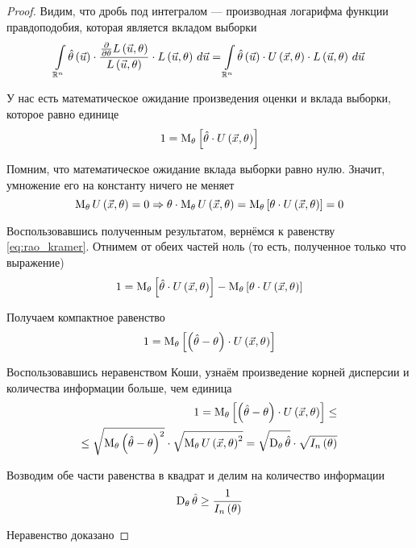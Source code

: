 \begin{proof}
  Видим, что дробь под интегралом --- производная логарифма
  функции правдоподобия, которая является вкладом выборки
  $$\integral{\mathbb{R}^n}{}{\vec{u}}{\hat{\theta}\left( \vec{u} \right)
    \cdot \frac{
      \frac{\partial}{\partial \theta}L\left( \vec{u},\theta \right)}
      {L\left( \vec{u},\theta \right)}
        \cdot L\left( \vec{u},\theta \right)}
    = \integral{\mathbb{R}^n}{}{\vec{u}}{\hat{\theta}\left( \vec{u} \right)
      \cdot
        U\left( \vec{x},\theta \right)
          \cdot L\left( \vec{u},\theta \right)}$$

  У нас есть математическое ожидание произведения оценки и вклада выборки,
  которое равно единице
  \begin{equation}\label{eq:rao_kramer}
    1 = \Meanof{\theta}{\hat{\theta}\cdot U\left( \vec{x},\theta \right)}
  \end{equation}

  Помним, что математическое ожидание вклада выборки равно нулю.
  Значит, умножение его на константу ничего не меняет
  $$\meanof{\theta}{U\left( \vec{x},\theta \right)}=0
    \Rightarrow 
    \theta\cdot\meanof{\theta}{U\left( \vec{x},\theta \right)}
    = \Meanof{\theta}{\theta\cdot U\left(\vec{x},\theta\right)}
    = 0$$

  Воспользовавшись полученным результатом,
  вернёмся к равенству \eqref{eq:rao_kramer}.
  Отнимем от обеих частей ноль (то есть, полученное только что выражение)
  $$1 = \Meanof{\theta}{\hat{\theta}\cdot U\left( \vec{x},\theta \right)}
    - \Meanof{\theta}{\theta\cdot U\left(\vec{x},\theta\right)}$$

  Получаем компактное равенство
  $$1 = \Meanof{\theta}{\left(\hat{\theta}-\theta\right)
    \cdot U\left( \vec{x},\theta \right)}$$

  Воспользовавшись неравенством Коши, узнаём
  произведение корней дисперсии и количества информации больше, чем единица
  \begin{equation}\label{eq:rao_kramer_koshi}
    \begin{split}
    1 = \meanof{\theta}{
      \left[\left(\hat{\theta}-\theta\right)
        \cdot U\left( \vec{x},\theta \right)\right]} \le \\
    \le \sqrt{\meanof{\theta}{
      \left(\hat{\theta}-\theta\right)^2}}
      \cdot\sqrt{\meanof{\theta}{U\left( \vec{x},\theta \right)^2}}
    = \sqrt{\dispersionof{\theta}{\hat{\theta}}}
      \cdot\sqrt{I_n\left(\theta\right)}
    \end{split}
  \end{equation}

  Возводим обе части равенства в квадрат и делим на количество информации
  $$\dispersionof{\theta}{\hat{\theta}}\ge \frac{1}{I_n\left(\theta\right)}$$

  Неравенство доказано
\end{proof}
